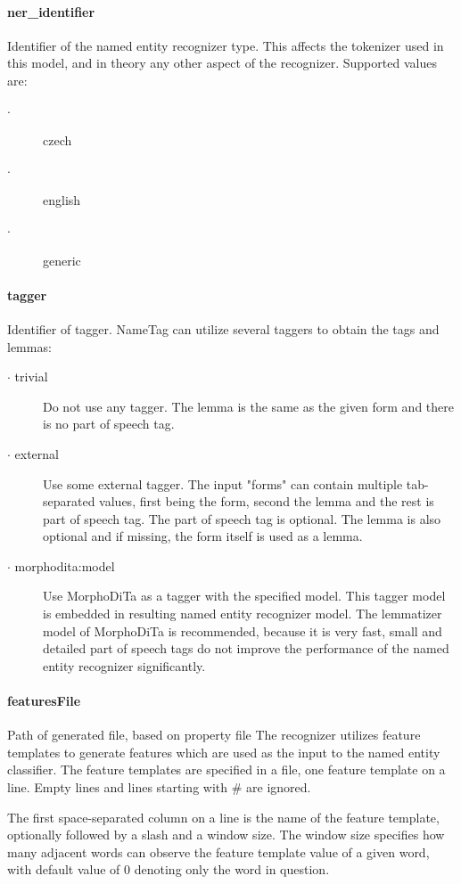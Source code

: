 \documentclass[12pt,a4paper]{report}
\begin{document}
\paragraph{ner\_identifier}
Identifier of the named entity recognizer type. This affects the tokenizer used in this model, and in theory any other aspect of the recognizer. Supported values are:
\begin{description}
\item[$\cdot$] czech
\item[$\cdot$] english
\item[$\cdot$] generic
\end{description}

\paragraph{tagger}
Identifier of tagger. NameTag can utilize several taggers to obtain the tags and lemmas:

\begin{description}
\item[$\cdot$ trivial] Do not use any tagger. The lemma is the same as the given form and there is no part of speech tag.
\item[$\cdot$ external] Use some external tagger. The input "forms" can contain multiple tab-separated values, first being the form, second the lemma and the rest is part of speech tag. The part of speech tag is optional. The lemma is also optional and if missing, the form itself is used as a lemma.
\item[$\cdot$ morphodita:model] Use MorphoDiTa as a tagger with the specified model. This tagger model is embedded in resulting named entity recognizer model. The lemmatizer model of MorphoDiTa is recommended, because it is very fast, small and detailed part of speech tags do not improve the performance of the named entity recognizer significantly.
\end{description}

\paragraph{featuresFile}
Path of generated file, based on property file 
The recognizer utilizes feature templates to generate features which are used as the input to the named entity classifier. The feature templates are specified in a file, one feature template on a line. Empty lines and lines starting with \# are ignored.

The first space-separated column on a line is the name of the feature template, optionally followed by a slash and a window size. The window size specifies how many adjacent words can observe the feature template value of a given word, with default value of 0 denoting only the word in question.
\end{document}
